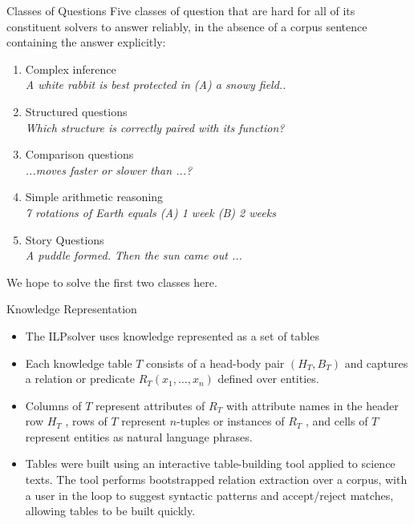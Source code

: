 \documentclass[final]{beamer}
\newlength{\onecolwid}
\begin{document}
\begin{frame}[t]
\begin{columns}[t]
\begin{column}{\onecolwid}
	\begin{block}{Classes of Questions}
		Five classes of question that are hard for all of its constituent solvers to answer
		reliably, in the absence of a corpus sentence containing the answer explicitly:
		\begin{enumerate}
			\item Complex inference \\
			\textit{A white rabbit is best protected in (A) a snowy field..}
			\item Structured questions \\ 
			\textit{Which structure is correctly paired with its function? }
			\item Comparison questions \\
			\textit{ ...moves faster or slower than ...?}
			\item Simple arithmetic reasoning \\ 
			\textit{7 rotations of Earth equals (A) 1 week (B) 2 weeks}
			\item Story Questions \\ 
			\textit{A puddle formed. Then the sun came out ...}
		\end{enumerate}
		We hope to solve the first two classes here. 
	\end{block}
	
	\begin{block}{Knowledge Representation}
		\begin{itemize}
			\item The ILPsolver uses knowledge represented as a set of tables
			\item Each knowledge table $T$ consists of a head-body pair $(H_T ,B_T )$ and captures a relation or predicate $R_T(x_1, \hdots, x_n )$ defined over entities.
			\item Columns of $T$ represent attributes of $R_T$ with attribute names in the header row $H_T$ , rows of $T$ represent $n$-tuples or instances
			of $R_T$ , and cells of $T$ represent entities as natural language
			phrases.
			\item Tables were built using an interactive table-building tool
			applied to science texts. The tool performs bootstrapped relation extraction over a corpus, with a user in the loop to
			suggest syntactic patterns and accept/reject matches, allowing tables to be built quickly.
		\end{itemize}	
	\end{block}

\end{column} %


\end{columns}
\end{frame}
\end{document}
